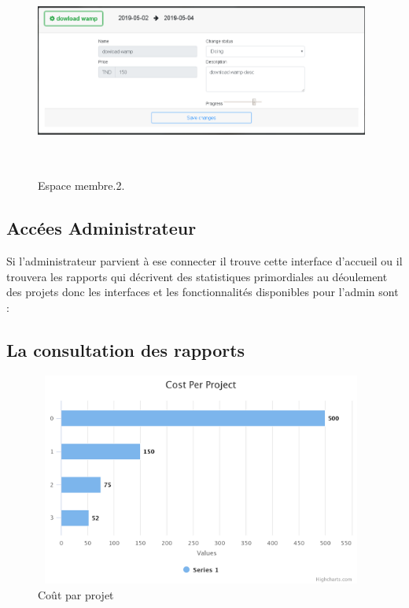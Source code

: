 \FloatBarrier
\begin{figure}[H]
\center
\includegraphics[width=11cm,height=7cm]{./figures/pres/3.png}
\caption{Espace membre.2.}

\end{figure}
\FloatBarrier
\subsection{Acc\'{e}es Administrateur}

Si l'administrateur parvient \`{a} ese connecter il trouve cette interface d'accueil
ou il trouvera les rapports qui d\'{e}crivent des statistiques primordiales au
d\'{e}oulement des projets donc les interfaces et les fonctionnalit\'{e}s disponibles
pour l'admin sont :

\subsection{La consultation des rapports}


\FloatBarrier
\begin{figure}[H]
\center
\includegraphics[width=11cm,height=7cm]{./figures/pres/cost-per-project.png}
\caption{ Co\^{u}t par projet }
\end{figure}
\FloatBarrier

